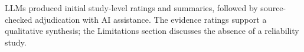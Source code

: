 \documentclass[11pt]{article}
\begin{document}
LLMs produced initial study-level ratings and summaries, followed by source-checked adjudication with AI assistance.
The evidence ratings support a qualitative synthesis; the Limitations section discusses the absence of a reliability study.

%

\clearpage
\onecolumn
\end{document}
